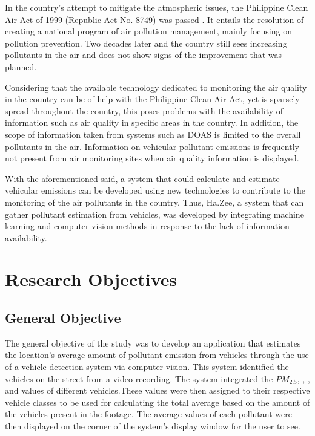 In the country’s attempt to mitigate the atmospheric issues, the Philippine Clean Air Act of 1999 (Republic Act No. 8749) was passed \cite{FAO}. It entails the resolution of creating a national program of air pollution management, mainly focusing on pollution prevention. Two decades later and the country still sees increasing pollutants in the air and does not show signs of the improvement that was planned.

Considering that the available technology dedicated to monitoring the air quality in the country can be of help with the Philippine Clean Air Act, yet is sparsely spread throughout the country, this poses problems with the availability of information such as air quality in specific areas in the country. In addition, the scope of information taken from systems such as DOAS is limited to the overall pollutants in the air. Information on vehicular pollutant emissions is frequently not present from air monitoring sites when air quality information is displayed.

With the aforementioned said, a system that could calculate and estimate vehicular emissions can be developed using new technologies to contribute to the monitoring of the air pollutants in the country. Thus, Ha.Zee, a system that can gather pollutant estimation from vehicles, was developed by integrating machine learning and computer vision methods in response to the lack of information availability.



\section{Research Objectives}
\label{sec:researchobjectives}

\subsection{General Objective}
\label{sec:generalobjective}


The general objective of the study was to develop an application that estimates the location’s average amount of  pollutant emission from vehicles through the use of a vehicle detection system via computer vision. This system identified the vehicles on the street from a video recording. The system integrated the $PM_{2.5}$, , , and  values of different vehicles.These values were then assigned to their respective vehicle classes to be used for calculating the total average based on the amount of the vehicles present in the footage. The average values of each pollutant were then displayed on the corner of the system's display window for the user to see.



